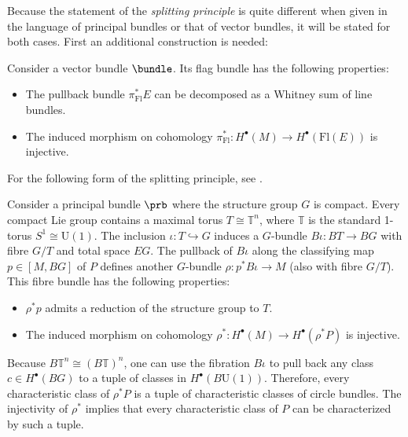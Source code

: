     Because the statement of the \textit{splitting principle} is quite different when given in the language of principal bundles or that of vector bundles, it will be stated for both cases. First an additional construction is needed:
    \begin{theorem}
        Consider a vector bundle $\bundle$. Its flag bundle has the following properties:
        \begin{itemize}
            \item The pullback bundle $\pi_\mathrm{Fl}^*E$ can be decomposed as a Whitney sum of line bundles.
            \item The induced morphism on cohomology $\pi_\mathrm{Fl}^*:H^\bullet(M)\rightarrow H^\bullet(\mathrm{Fl}(E))$ is injective.
        \end{itemize}
    \end{theorem}
    For the following form of the splitting principle, see \cite{may_splitting, debray_characteristic}.
    \begin{theorem}
        Consider a principal bundle $\prb$ where the structure group $G$ is compact. Every compact Lie group contains a maximal torus $T\cong\mathbb{T}^n$, where $\mathbb{T}$ is the standard 1-torus $S^1\cong\mathrm{U}(1)$. The inclusion $\iota:T\hookrightarrow G$ induces a $G$-bundle $B\iota:BT\rightarrow BG$ with fibre $G/T$ and total space $EG$. The pullback of $B\iota$ along the classifying map $p\in[M,BG]$ of $P$ defines another $G$-bundle $\rho:p^*B\iota\rightarrow M$ (also with fibre $G/T$). This fibre bundle has the following properties:
        \begin{itemize}
            \item $\rho^*p$ admits a reduction of the structure group to $T$.
            \item The induced morphism on cohomology $\rho^*:H^\bullet(M)\rightarrow H^\bullet(\rho^*P)$ is injective.
        \end{itemize}
    \end{theorem}
    Because $B\mathbb{T}^n\cong(B\mathbb{T})^n$, one can use the fibration $B\iota$ to pull back any class $c\in H^\bullet(BG)$ to a tuple of classes in $H^\bullet(B\mathrm{U}(1))$. Therefore, every characteristic class of $\rho^*P$ is a tuple of characteristic classes of circle bundles. The injectivity of $\rho^*$ implies that every characteristic class of $P$ can be characterized by such a tuple.

